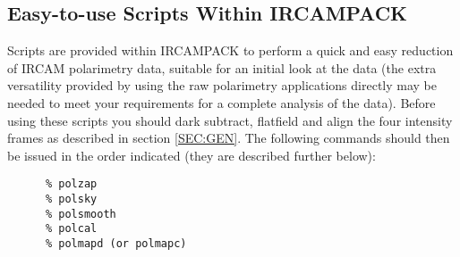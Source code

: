 \subsection{Easy-to-use Scripts Within IRCAMPACK}

Scripts are provided within {\small IRCAMPACK} to perform a quick and
easy reduction of {\small IRCAM} polarimetry data, suitable for an
initial look at the data (the extra versatility provided by using the
raw polarimetry applications directly may be needed to meet your
requirements for a complete analysis of the data). Before using these
scripts you should dark subtract, flatfield and align the four
intensity frames as described in section \ref{SEC:GEN}. The following
commands should then be issued in the order indicated (they are
described further below):

\small
\begin{verbatim}
      % polzap
      % polsky
      % polsmooth
      % polcal
      % polmapd (or polmapc)
\end{verbatim}
\normalsize

